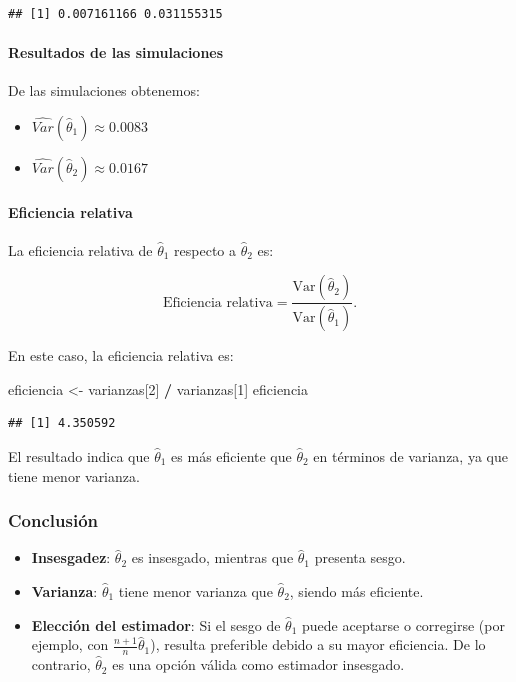 \documentclass[
]{article}
\newenvironment{Shaded}{\begin{snugshade}}{\end{snugshade}}
\newcommand{\DecValTok}[1]{\textcolor[rgb]{0.00,0.00,0.81}{#1}}
\newcommand{\NormalTok}[1]{#1}
\newcommand{\OtherTok}[1]{\textcolor[rgb]{0.56,0.35,0.01}{#1}}
\newcommand{\SpecialCharTok}[1]{\textcolor[rgb]{0.81,0.36,0.00}{\textbf{#1}}}
\providecommand{\tightlist}{%
  \setlength{\itemsep}{0pt}\setlength{\parskip}{0pt}}
\begin{document}
\begin{verbatim}
## [1] 0.007161166 0.031155315
\end{verbatim}

\paragraph{Resultados de las simulaciones}\label{resultados-de-las-simulaciones-1}

De las simulaciones obtenemos:

\begin{itemize}
\tightlist
\item
  \(\widehat{Var}(\hat{\theta}_1) \approx 0.0083\)
\item
  \(\widehat{Var}(\hat{\theta}_2) \approx 0.0167\)
\end{itemize}

\paragraph{Eficiencia relativa}\label{eficiencia-relativa}

La eficiencia relativa de \(\hat{\theta}_1\) respecto a \(\hat{\theta}_2\) es:

\[
\text{Eficiencia relativa} = \frac{\text{Var}(\hat{\theta}_2)}{\text{Var}(\hat{\theta}_1)}.
\]

En este caso, la eficiencia relativa es:

\begin{Shaded}
\begin{Highlighting}[]
\NormalTok{eficiencia }\OtherTok{\textless{}{-}}\NormalTok{ varianzas[}\DecValTok{2}\NormalTok{] }\SpecialCharTok{/}\NormalTok{ varianzas[}\DecValTok{1}\NormalTok{]}
\NormalTok{eficiencia}
\end{Highlighting}
\end{Shaded}

\begin{verbatim}
## [1] 4.350592
\end{verbatim}

El resultado indica que \(\hat{\theta}_1\) es más eficiente que \(\hat{\theta}_2\) en términos de varianza, ya que tiene menor varianza.

\subsubsection{Conclusión}\label{conclusiuxf3n-4}

\begin{itemize}
\tightlist
\item
  \textbf{Insesgadez}: \(\hat{\theta}_2\) es insesgado, mientras que \(\hat{\theta}_1\) presenta sesgo.
\item
  \textbf{Varianza}: \(\hat{\theta}_1\) tiene menor varianza que \(\hat{\theta}_2\), siendo más eficiente.
\item
  \textbf{Elección del estimador}: Si el sesgo de \(\hat{\theta}_1\) puede aceptarse o corregirse (por ejemplo, con \(\frac{n+1}{n}\hat{\theta}_1\)), resulta preferible debido a su mayor eficiencia. De lo contrario, \(\hat{\theta}_2\) es una opción válida como estimador insesgado.
\end{itemize}
\end{document}
